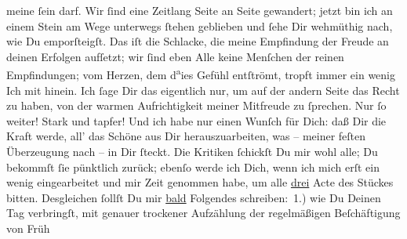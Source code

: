                    meine ſein darf. Wir ſind eine Zeitlang Seite an Seite gewandert; jetzt bin
               ich an einem Stein am Wege unterwegs ſtehen geblieben und ſehe Dir wehmüthig nach,
               wie Du emporſteigſt. Das iſt die Schlacke, die meine Empfindung der Freude an deinen
               Erfolgen aufſetzt; wir ſind eben Alle keine Menſchen der reinen Empfindungen; vom
               Herzen, dem d\substVorne{}\textsuperscript{a}\substDazwischen{}ie\substHinten{}s Gefühl entſtrömt, tropft immer ein wenig Ich mit hinein. Ich ſage Dir das
               eigentlich nur, um auf der andern Seite das Recht zu haben, von der warmen
               Aufrichtigkeit meiner Mitfreude zu ſprechen. Nur ſo weiter! Stark und tapfer! Und ich
               habe nur einen Wunſch für Dich: daß \strikeout{\textcolor{gray}{al}} Dir  die Kraft werde, all’ das Schöne
               aus Dir herauszuarbeiten, was – meiner feſten Überzeugung nach – in Dir ſteckt. Die
               Kritiken ſchickſt Du mir wohl alle; Du bekommſt ſie pünktlich zurück; ebenſo werde
               ich Dich, wenn ich mich erſt ein wenig eingearbeitet und mir Zeit genommen habe, um
               alle \uline{drei} Acte des Stückes{\pb}
               bitten. Desgleichen ſollſt Du mir \uline{bald}{ }Folgendes schreiben: 1.) wie Du Deinen Tag
               verbringſt, mit genauer trockener Aufzählung der regelmäßigen Beſchäftigung von Früh
